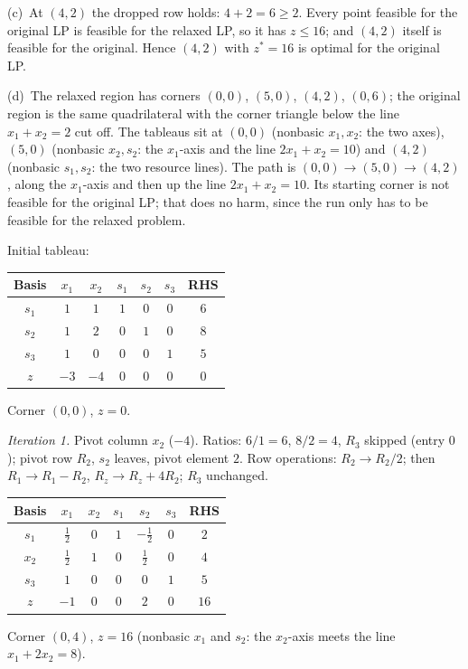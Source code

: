 \begin{solutions}
        (c)~At $(4,2)$ the dropped row holds: $4+2=6\ge 2$. Every point
        feasible for the original LP is feasible for the relaxed LP, so
        it has $z\le 16$; and $(4,2)$ itself is feasible for the original.
        Hence $(4,2)$ with $z^{*}=16$ is optimal for the original LP.

        (d)~The relaxed region has corners $(0,0)$, $(5,0)$, $(4,2)$,
        $(0,6)$; the original region is the same quadrilateral with the
        corner triangle below the line $x_1+x_2=2$ cut off. The tableaus
        sit at $(0,0)$ (nonbasic $x_1,x_2$: the two axes), $(5,0)$
        (nonbasic $x_2,s_2$: the $x_1$-axis and the line $2x_1+x_2=10$)
        and $(4,2)$ (nonbasic $s_1,s_2$: the two resource lines). The path
        is $(0,0)\to(5,0)\to(4,2)$, along the $x_1$-axis and then up the
        line $2x_1+x_2=10$. Its starting corner is not feasible for the
        original LP; that does no harm, since the run only has to be
        feasible for the relaxed problem.

  \item Initial tableau:
        \begin{center}
        \begin{tabular}{c|ccccc|c}
        Basis & $x_1$ & $x_2$ & $s_1$ & $s_2$ & $s_3$ & RHS\\
        \hline
        $s_1$ & $1$ & $1$ & $1$ & $0$ & $0$ & $6$\\
        $s_2$ & $1$ & $2$ & $0$ & $1$ & $0$ & $8$\\
        $s_3$ & $1$ & $0$ & $0$ & $0$ & $1$ & $5$\\
        \hline
        $z$ & $-3$ & $-4$ & $0$ & $0$ & $0$ & $0$\\
        \end{tabular}
        \end{center}
        Corner $(0,0)$, $z=0$.

        \emph{Iteration 1.} Pivot column $x_2$ ($-4$). Ratios: $6/1=6$,
        $8/2=4$, $R_3$ skipped (entry $0$); pivot row $R_2$, $s_2$
        leaves, pivot element $2$. Row operations: $R_2\to R_2/2$; then
        $R_1\to R_1-R_2$, $R_z\to R_z+4R_2$; $R_3$ unchanged.
        \begin{center}
        \begin{tabular}{c|ccccc|c}
        Basis & $x_1$ & $x_2$ & $s_1$ & $s_2$ & $s_3$ & RHS\\
        \hline
        $s_1$ & $\tfrac{1}{2}$ & $0$ & $1$ & $-\tfrac{1}{2}$ & $0$ & $2$\\
        $x_2$ & $\tfrac{1}{2}$ & $1$ & $0$ & $\tfrac{1}{2}$ & $0$ & $4$\\
        $s_3$ & $1$ & $0$ & $0$ & $0$ & $1$ & $5$\\
        \hline
        $z$ & $-1$ & $0$ & $0$ & $2$ & $0$ & $16$\\
        \end{tabular}
        \end{center}
        Corner $(0,4)$, $z=16$ (nonbasic $x_1$ and $s_2$: the $x_2$-axis
        meets the line $x_1+2x_2=8$).


\end{solutions}
